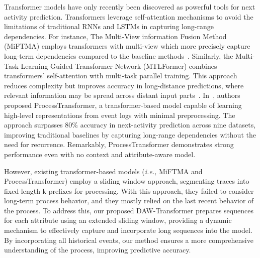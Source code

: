 Transformer models have only recently been discovered as powerful tools for next activity prediction. Transformers leverage self-attention mechanisms to avoid the limitations of traditional RNNs and LSTMs in capturing long-range dependencies. For instance, The Multi-View information Fusion Method (MiFTMA) employs transformers with multi-view which more precisely capture long-term dependencies compared to the baseline methods~\citep{wang2023mitfm}. Similarly, the Multi-Task Learning Guided Transformer Network (MTLFormer) combines transformers' self-attention with multi-task parallel training. This approach reduces complexity but improves accuracy in long-distance predictions, where relevant information may be spread across distant input parts~\citep{wang2023mtlformer}.
In~\citep{bukhsh2021processtransformer}, authors proposed ProcessTransformer, a transformer-based model capable of learning high-level representations from event logs with minimal preprocessing. The approach surpasses 80\% accuracy in next-activity prediction across nine datasets, improving traditional baselines by capturing long-range dependencies without the need for recurrence. Remarkably, ProcessTransformer demonstrates strong performance even with no context and attribute-aware model.

However, existing transformer-based models (\textit{i.e.,} MiFTMA and ProcessTransformer) employ a sliding window approach, segmenting traces into fixed-length k-prefixes for processing. With this approach, they failed to consider long-term process behavior, and they mostly relied on the last recent behavior of the process. To address this, our proposed DAW-Transformer prepares sequences for each attribute using an extended sliding window, providing a dynamic mechanism to effectively capture and incorporate long sequences into the model. By incorporating all historical events, our method ensures a more comprehensive understanding of the process, improving predictive accuracy.